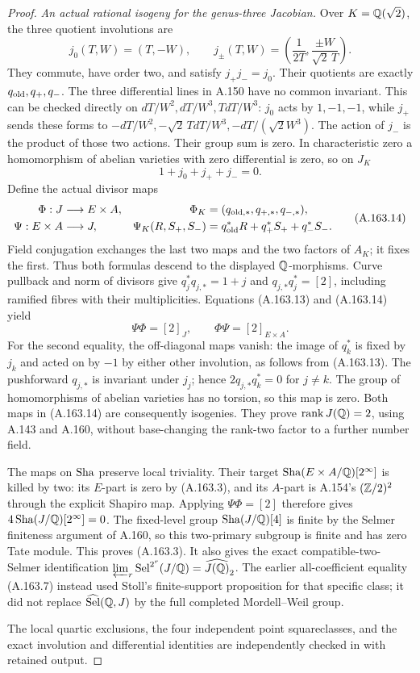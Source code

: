 \begin{proof}
\emph{An actual rational isogeny for the genus-three Jacobian.}
Over \(K=\mathbb Q(\sqrt2)\), the three quotient involutions
are
\[
 j_0(T,W)=(T,-W),\qquad
 j_\pm(T,W)=\left(\frac1{2T},
                            \frac{\pm W}{\sqrt2\,T}\right).
\tag{A.163.12}
\]
They commute, have order two, and satisfy
\(j_+j_-=j_0\).  Their quotients are exactly
\(q_{\rm old},q_+,q_-\).  The three differential
lines in A.150 have no common invariant.  This
can be checked directly on
\(dT/W^2,dT/W^3,TdT/W^3\): \(j_0\) acts by
\(1,-1,-1\), while \(j_+\) sends these forms to
\(-dT/W^2,-\sqrt2\,TdT/W^3,-dT/(\sqrt2 W^3)\).
The action of \(j_-\) is the product of those two
actions.  Their group sum is zero.  In characteristic
zero a homomorphism of abelian varieties with zero
differential is zero, so on \(J_K\)
\[
                         1+j_0+j_++j_-=0.
\tag{A.163.13}
\]
Define the actual divisor maps
\[
 \begin{aligned}
 \Phi:J&\longrightarrow E\times A,
                &\Phi_K&=(q_{{\rm old},*},q_{+,*},q_{-,*}),\\
 \Psi:E\times A&\longrightarrow J,
                &\Psi_K(R,S_+,S_-)
                         &=q_{\rm old}^*R+q_+^*S_++q_-^*S_-.
 \end{aligned}
\tag{A.163.14}
\]
Field conjugation exchanges the last two maps and
the two factors of \(A_K\); it fixes the first.
Thus both formulas descend to the displayed
\(\mathbb Q\)-morphisms.  Curve pullback and norm of
divisors give
\(q_j^*q_{j,*}=1+j\) and
\(q_{j,*}q_j^*=[2]\), including ramified fibres
with their multiplicities.  Equations (A.163.13)
and (A.163.14) yield
\[
                            \Psi\Phi=[2]_J,
                           \qquad\Phi\Psi=[2]_{E\times A}.
\tag{A.163.15}
\]
For the second equality, the off-diagonal maps
vanish: the image of \(q_k^*\) is fixed by \(j_k\)
and acted on by \(-1\) by either other involution,
as follows from (A.163.13).  The pushforward
\(q_{j,*}\) is invariant under \(j_j\); hence
\(2q_{j,*}q_k^*=0\) for \(j\ne k\).
The group of homomorphisms of abelian varieties
has no torsion, so this map is zero.
Both maps in (A.163.14) are consequently isogenies.
They prove \(\operatorname{rank}J(\mathbb Q)=2\), using
A.143 and A.160, without base-changing the
rank-two factor to a further number field.

The maps on \(\operatorname{Sha}\) preserve local triviality.
Their target \(\operatorname{Sha}(E\times A/\mathbb Q)[2^\infty]\)
is killed by two: its \(E\)-part is zero by
(A.163.3), and its \(A\)-part is A.154's
\((\mathbb Z/2)^2\) through the explicit Shapiro map.
Applying \(\Psi\Phi=[2]\) therefore gives
\(4\operatorname{Sha}(J/\mathbb Q)[2^\infty]=0\).
The fixed-level group \(\operatorname{Sha}(J/\mathbb Q)[4]\) is
finite by the Selmer finiteness argument of A.160,
so this two-primary subgroup is finite and has
zero Tate module.  This proves (A.163.3).
It also gives the exact compatible-two-Selmer
identification
\(\varprojlim_r\operatorname{Sel}^{2^r}(J/\mathbb Q)
=\widehat{J(\mathbb Q)}_2\).
The earlier all-coefficient equality (A.163.7)
instead used Stoll's finite-support proposition
for that specific class; it did not replace
\(\widehat{\operatorname{Sel}}(\mathbb Q,J)\) by the
full completed Mordell--Weil group.

The local quartic exclusions, the four independent
point squareclasses, and the exact involution and
differential identities are independently checked in
with retained output.
\end{proof}
